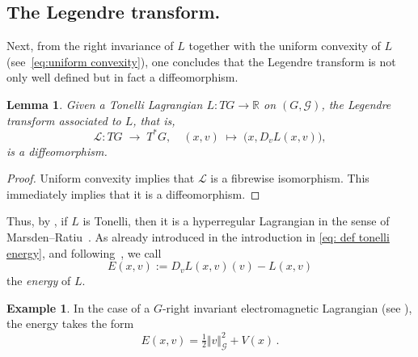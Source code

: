 \documentclass[11pt,reqno]{amsart}
\theoremstyle{plain}
\newtheorem{lem}[thm]{Lemma}
\theoremstyle{definition}
\newtheorem{example}[thm]{Example}
\theoremstyle{plain} %
\newtheorem{lem}[lem]{Lemma}
\theoremstyle{definition} %
\newtheorem{example}[example]{Example}
\numberwithin{equation}{section}
\def\G{\mathcal{G}}
\def\RR{{\mathbb R}}
\begin{document}
\subsection{The Legendre transform.}
Next, from the right invariance of $L$ together with the uniform convexity of $L$ (see~\eqref{eq:uniform convexity}), 
one concludes that the Legendre transform is not only well defined but in fact a diffeomorphism.

\begin{lem}\label{lem: Tonelli implies legendre is diffeo}
    Given a Tonelli Lagrangian $L: TG \to \RR$ on $(G, \G)$, 
    the Legendre transform associated to $L$, that is,
    \begin{equation}\label{eq: defi legendre transform}
          \mathcal{L} : TG \;\to\; T^*G, 
    \quad (x,v) \;\mapsto\; \bigl(x, D_v L(x,v)\bigr),
    \end{equation}
    is a diffeomorphism.
\end{lem}

\begin{proof}
    Uniform convexity implies that \( \mathcal L \) is a fibrewise isomorphism. This immediately implies that it is a diffeomorphism.
\end{proof}

Thus, by , if $L$ is Tonelli, then it is a hyperregular Lagrangian in the sense of Marsden–Ratiu~\cite[§7.3]{MardsenRatiuMechanics}. 
As already introduced in the introduction in \eqref{eq: def tonelli energy}, and following~\cite[§7.3]{MardsenRatiuMechanics}, we call  
\begin{equation}\label{eq: def tonelli energy}
    E(x,v) := D_v L(x,v)(v) - L(x,v)
\end{equation}
the \emph{energy} of $L$.

\begin{example}
    In the case of a $G$-right invariant electromagnetic Lagrangian (see ), the energy takes the form  
    \begin{equation}\label{eq: energy electromagnetic}
        E(x,v) = \tfrac{1}{2}\Vert v\Vert_{\G}^2 + V(x) \, .
    \end{equation}
\end{example}
\end{document}
